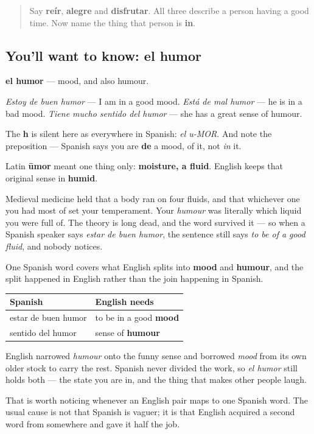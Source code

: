 \label{lesson:ES-C440-humor}



\begin{quote}
Say \textbf{reír}, \textbf{alegre} and \textbf{disfrutar}. All three describe a person having a good time. Now name the thing that person is \textbf{in}.
\end{quote}

\subsection*{You'll want to know: el humor}
\textbf{el humor} — mood, and also humour.

\emph{Estoy de buen humor} — I am in a good mood. \emph{Está de mal humor} — he is in a bad mood. \emph{Tiene mucho sentido del humor} — she has a great sense of humour.

The \textbf{h} is silent here as everywhere in Spanish: \emph{el u-MOR}. And note the preposition — Spanish says you are \textbf{de} a mood, of it, not \emph{in} it.

\begin{cousinweb}
Latin \textbf{ūmor} meant one thing only: \textbf{moisture, a fluid}. English keeps that original sense in \textbf{humid}.

Medieval medicine held that a body ran on four fluids, and that whichever one you had most of set your temperament. Your \emph{humour} was literally which liquid you were full of. The theory is long dead, and the word survived it — so when a Spanish speaker says \emph{estar de buen humor}, the sentence still says \emph{to be of a good fluid}, and nobody notices.
\end{cousinweb}

\begin{culture}
One Spanish word covers what English splits into \textbf{mood} and \textbf{humour}, and the split happened in English rather than the join happening in Spanish.

\noindent
\begin{tabularx}{\linewidth}{@{}>{\raggedright\arraybackslash}X>{\raggedright\arraybackslash}X@{}}
\toprule
\textbf{Spanish} & \textbf{English needs} \\
\midrule
estar de buen humor & to be in a good \textbf{mood} \\
sentido del humor & sense of \textbf{humour} \\
\bottomrule
\end{tabularx}

English narrowed \emph{humour} onto the funny sense and borrowed \emph{mood} from its own older stock to carry the rest. Spanish never divided the work, so \emph{el humor} still holds both — the state you are in, and the thing that makes other people laugh.

That is worth noticing whenever an English pair maps to one Spanish word. The usual cause is not that Spanish is vaguer; it is that English acquired a second word from somewhere and gave it half the job.
\end{culture}

